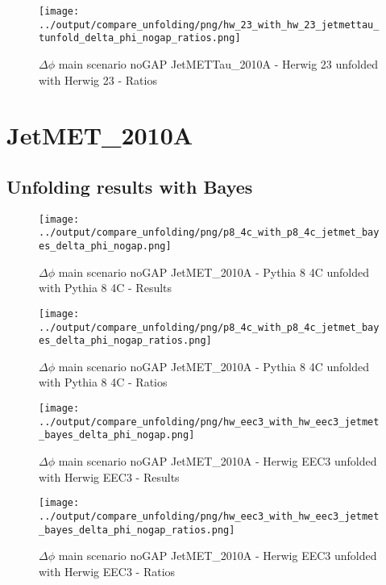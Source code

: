 \documentclass[11pt]{book}
\begin{document}
\begin{figure}[ht]
\centering
\texttt{[image: ../output/compare\_unfolding/png/hw\_23\_with\_hw\_23\_jetmettau\_tunfold\_delta\_phi\_nogap\_ratios.png]}
\caption{$\Delta\phi$ main scenario noGAP JetMETTau\_2010A - Herwig 23 unfolded with Herwig 23 - Ratios}
\label{hw_23_hw_23_jetmettau_tunfold_delta_phi_nogap_b}
\end{figure}


\clearpage
\section{JetMET\_2010A}
\subsection{Unfolding results with Bayes}

\begin{figure}[ht]
\centering
\texttt{[image: ../output/compare\_unfolding/png/p8\_4c\_with\_p8\_4c\_jetmet\_bayes\_delta\_phi\_nogap.png]}
\caption{$\Delta\phi$ main scenario noGAP JetMET\_2010A - Pythia 8 4C unfolded with Pythia 8 4C - Results}
\label{p8_p8_jetmet_bayes_delta_phi_nogap_a}
\end{figure}

\begin{figure}[ht]
\centering
\texttt{[image: ../output/compare\_unfolding/png/p8\_4c\_with\_p8\_4c\_jetmet\_bayes\_delta\_phi\_nogap\_ratios.png]}
\caption{$\Delta\phi$ main scenario noGAP JetMET\_2010A - Pythia 8 4C unfolded with Pythia 8 4C - Ratios}
\label{p8_p8_jetmet_bayes_delta_phi_nogap_b}
\end{figure}

\begin{figure}[ht]
\centering
\texttt{[image: ../output/compare\_unfolding/png/hw\_eec3\_with\_hw\_eec3\_jetmet\_bayes\_delta\_phi\_nogap.png]}
\caption{$\Delta\phi$ main scenario noGAP JetMET\_2010A - Herwig EEC3 unfolded with Herwig EEC3 - Results}
\label{hw_eec3_hw_eec3_jetmet_bayes_delta_phi_nogap_a}
\end{figure}

\begin{figure}[ht]
\centering
\texttt{[image: ../output/compare\_unfolding/png/hw\_eec3\_with\_hw\_eec3\_jetmet\_bayes\_delta\_phi\_nogap\_ratios.png]}
\caption{$\Delta\phi$ main scenario noGAP JetMET\_2010A - Herwig EEC3 unfolded with Herwig EEC3 - Ratios}
\label{hw_eec3_hw_eec3_jetmet_bayes_delta_phi_nogap_b}
\end{figure}
\end{document}
